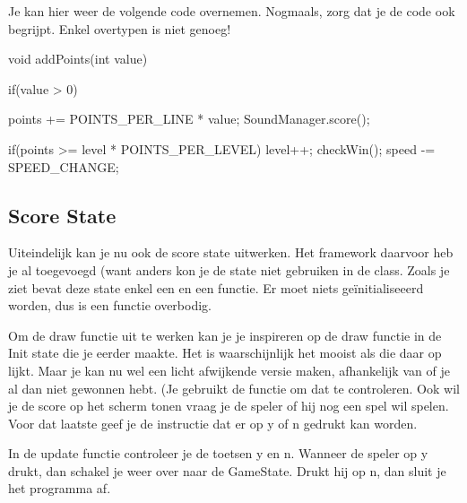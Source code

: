 Je kan hier weer de volgende code overnemen. Nogmaals, zorg dat je de code ook begrijpt. Enkel overtypen is niet genoeg!

\begin{code}
void addPoints(int value)
{
	 if(value > 0)
	 {
	 	  points += POINTS_PER_LINE * value;
	 	  SoundManager.score();
	 		
	 	  if(points >= level * POINTS_PER_LEVEL)
	 	  {
	 			 level++;
	 			 checkWin();
				 speed -= SPEED_CHANGE;
		  } 
	 }      
}
\end{code}

\subsection{Score State}
Uiteindelijk kan je nu ook de score state uitwerken. Het framework daarvoor heb je al toegevoegd (want anders kon je de state niet gebruiken in de  class. Zoals je ziet bevat deze state enkel een  en een  functie. Er moet niets ge\"initialiseeerd worden, dus is een  functie overbodig.

Om de draw functie uit te werken kan je je inspireren op de draw functie in de Init state die je eerder maakte. Het is waarschijnlijk het mooist als die daar op lijkt. Maar je kan nu wel een licht afwijkende versie maken, afhankelijk van of je al dan niet gewonnen hebt. (Je gebruikt de functie  om dat te controleren. Ook wil je de score op het scherm tonen vraag je de speler of hij nog een spel wil spelen. Voor dat laatste geef je de instructie dat er op y of n gedrukt kan worden.

In de update functie controleer je de toetsen y en n. Wanneer de speler op y drukt, dan schakel je weer over naar de GameState. Drukt hij op n, dan sluit je het programma af.